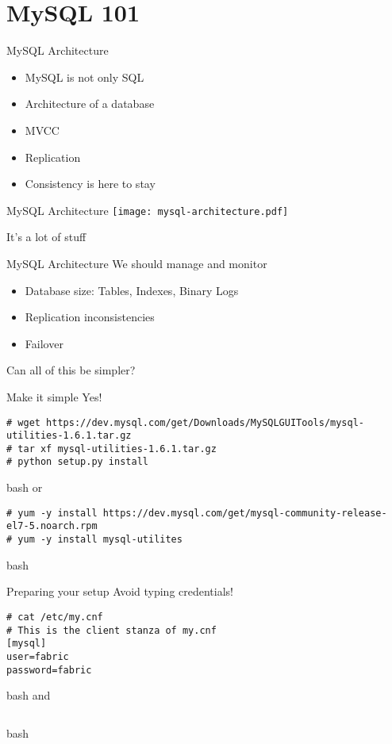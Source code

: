 \documentclass{beamer}[10]
\begin{document}
\section{MySQL 101}
\begin{pyframe}{MySQL Architecture}
\begin{itemize}
\item MySQL is not only SQL
\item Architecture of a database
\item MVCC
\item Replication
\item Consistency is here to stay
%
\end{itemize}
\end{pyframe}


\begin{pyframe}{MySQL Architecture}
\texttt{[image: mysql-architecture.pdf]}
{\large
\begin{center}
It's a lot of stuff
\end{center}
}
\end{pyframe}


\begin{pyframe}{MySQL Architecture}
We should manage and monitor
\begin{itemize}
\item Database size: Tables, Indexes, Binary Logs
\item Replication inconsistencies
\item Failover
\end{itemize}
Can all of this be simpler?
\end{pyframe}


\begin{pyframe}{Make it simple}
Yes!
\begin{verbatim}
# wget https://dev.mysql.com/get/Downloads/MySQLGUITools/mysql-utilities-1.6.1.tar.gz
# tar xf mysql-utilities-1.6.1.tar.gz
# python setup.py install
\end{verbatim}{bash}
or
\begin{verbatim}
# yum -y install https://dev.mysql.com/get/mysql-community-release-el7-5.noarch.rpm
# yum -y install mysql-utilites
\end{verbatim}{bash}
\end{pyframe}


\begin{pyframe}{Preparing your setup}
Avoid typing credentials!
\begin{verbatim}
# cat /etc/my.cnf
# This is the client stanza of my.cnf
[mysql]
user=fabric
password=fabric
\end{verbatim}{bash}
and
\begin{verbatim}

\end{verbatim}{bash}
\end{pyframe}
\end{document}
